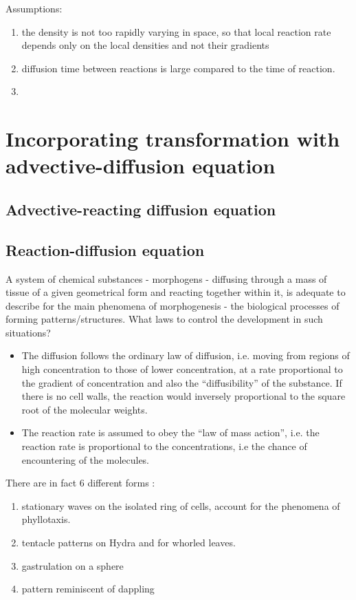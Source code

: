 Assumptions:
\begin{enumerate}
\item the density is not too rapidly varying in space, so that local
  reaction rate depends only on the local densities and not their
  gradients

\item diffusion time between reactions is large compared to the time
  of reaction.

\item 
\end{enumerate}

\section{Incorporating transformation with advective-diffusion equation}
\label{sec:incorp-transf-with}

\subsection{Advective-reacting diffusion equation}
\label{sec:advect-react-diff}


\subsection{Reaction-diffusion equation}
\label{sec:react-diff-equat}

A system of chemical substances - morphogens - diffusing through a
mass of tissue of a given geometrical form and reacting together
within it, is adequate to describe for the main phenomena of
morphogenesis - the biological processes of forming
patterns/structures. What laws to control the development in such
situations?
\begin{itemize}
\item The diffusion follows the ordinary law of diffusion, i.e. moving
  from regions of high concentration to those of lower concentration,
  at a rate proportional to the gradient of concentration and also the
  ``diffusibility'' of the substance. If there is no cell walls, the
  reaction would inversely proportional to the square root of the
  molecular weights.
\item The reaction rate is assumed to obey the ``law of mass
  action'', i.e. the reaction rate is proportional to the
  concentrations, i.e the chance of encountering of the molecules. 
\end{itemize}

There are in fact 6 different forms :
\begin{enumerate}
\item stationary waves on the isolated ring of cells, account for the
  phenomena of phyllotaxis.
\item tentacle patterns on Hydra and for whorled leaves. 
\item gastrulation on a sphere 
\item pattern reminiscent of dappling 
\end{enumerate}



